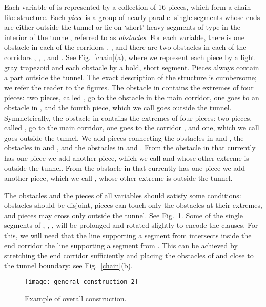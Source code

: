 \documentclass[11pt,a4paper]{article}
\begin{document}
Each variable  of  is represented by a collection of 16 pieces, which form a chain-like structure. Each \emph{piece} is a group of  nearly-parallel single segments whose ends are either outside the tunnel or lie on `short' heavy segments of type  in the interior of the tunnel, referred to as \emph{obstacles}. For each variable, there is one obstacle in each of the corridors , ,  and there are two obstacles in each of the corridors , , , and . See Fig.~\ref{chain}(a), where we represent each piece by a light gray trapezoid and each obstacle by a bold, short segment. Pieces always contain a part outside the tunnel. The exact description of the structure is cumbersome; we refer the reader to the figures. The obstacle in  contains the extremes of four pieces: two pieces, called , go to the obstacle in the main corridor, one goes to an obstacle in , and the fourth piece, which we call  goes outside the tunnel. Symmetrically, the obstacle in  contains the extremes of four pieces: two pieces, called , go to the main corridor, one goes to the corridor , and one, which we call  goes outside the tunnel. We add pieces connecting the obstacles in  and , the obstacles in   and , and the obstacles in  and . From the obstacle in  that currently has one piece we add another piece, which we call  and whose other extreme is outside the tunnel. From the obstacle in  that currently has one piece we add another piece, which we call , whose other extreme is outside the tunnel. 

The obstacles and the pieces of all variables should satisfy some conditions: obstacles should be disjoint, pieces can touch only the obstacles at their extremes, and pieces may cross only outside the tunnel. See Fig.~\ref{complete}. Some of the single segments of , , ,  will be prolonged and rotated slightly to encode the clauses. For this, we will need that the line supporting a segment from  intersects inside the end corridor the line supporting a segment from . This can be achieved by stretching the end corridor sufficiently and placing the obstacles of  and  close to the tunnel boundary; see Fig.~\ref{chain}(b).

\begin{figure}
\centering
\texttt{[image: general\_construction\_2]}
\caption{Example of overall construction.}
\label{complete}
\end{figure}
\end{document}
